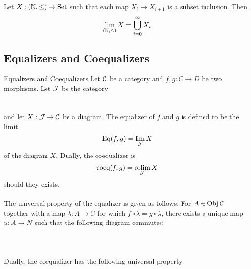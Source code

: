\documentclass[a4paper]{article}
\begin{document}
\begin{prp}{}{} Let $X:(\mathbb{N},\leq)\to\text{Set}$ such that each map $X_i\to X_{i+1}$ is a subset inclusion. Then $$\lim_{(\mathbb{N},\leq)}X=\bigcup_{i=0}^\infty X_i$$
\end{prp}

\subsection{Equalizers and Coequalizers}
\begin{defn}{Equalizers and Coequalizers}{} Let $\mathcal{C}$ be a category and $f,g:C\to D$ be two morphisms. Let $\mathcal{J}$ be the category \\
\\~\\
and let $X:\mathcal{J}\to\mathcal{C}$ be a diagram. The equalizer of $f$ and $g$ is defined to be the limit $$\text{Eq}(f,g)=\lim_{\mathcal{J}}X$$ of the diagram $X$. Dually, the coequalizer is $$\text{coeq}(f,g)=\operatorname*{colim}_{\mathcal{J}} X$$ should they exists. \\~\\

The universal property of the equalizer is given as follows: For $A\in\operatorname{Obj}\mathcal{C}$ together with a map $\lambda:A\to C$ for which $f\circ\lambda=g\circ\lambda$, there exists a unique map $u:A\to N$ such that the following diagram commutes: \\~\\
\\~\\

Dually, the coequalizer has the following universal property: \\~\\
\\~\\
\end{defn}
\end{document}
